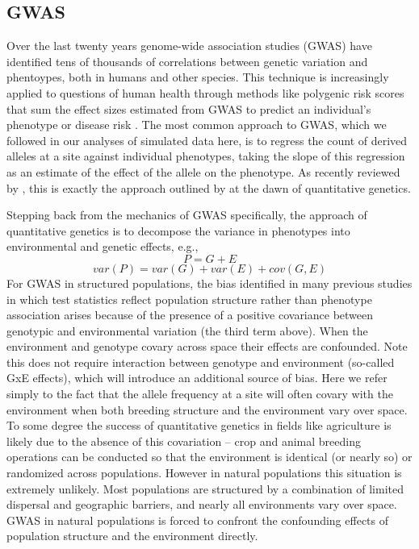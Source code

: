 \documentclass[11pt,twoside,lineno]{preprint}
\begin{document}
\subsection{GWAS}
Over the last twenty years genome-wide association studies (GWAS) have identified tens of thousands of correlations between genetic variation and phentoypes, both in humans and other species. This technique is increasingly applied to questions of human health through methods like polygenic risk scores that sum the effect sizes estimated from GWAS to predict an individual's phenotype or disease risk \citep{Khera2018}. The most common approach to GWAS, which we followed in our analyses of simulated data here, is to regress the count of derived alleles at a site against individual phenotypes, taking the slope of this regression as an estimate of the effect of the allele on the phenotype. As recently reviewed by \cite{Visscher2019}, this is exactly the approach outlined by \cite{Fisher1918} at the dawn of quantitative genetics. 

Stepping back from the mechanics of GWAS specifically, the approach of quantitative genetics is to decompose the variance in phenotypes into environmental and genetic effects, e.g., 
\begin{equation}
P=G+E
\end{equation}
\begin{equation}
var(P)=var(G)+var(E)+cov(G,E)
\end{equation}
For GWAS in structured populations, the bias identified in many previous studies \citep{Price2006,Yu2006,Young2018,Mathieson2012,Kang2008,Kang2010,Bulik-Sullivan2015} in which test statistics reflect population structure rather than phenotype association arises because of the presence of a positive covariance between genotypic and environmental variation (the third term above). When the environment and genotype covary across space their effects are confounded. Note this does not require interaction between genotype and environment (so-called GxE effects), which will introduce an additional source of bias. Here we refer simply to the fact that the allele frequency at a site will often covary with the environment when both breeding structure and the environment vary over space. To some degree the success of quantitative genetics in fields like agriculture is likely due to the absence of this covariation -- crop and animal breeding operations can be conducted so that the environment is identical (or nearly so) or randomized across populations. However in natural populations this situation is extremely unlikely. Most populations are structured by a combination of limited dispersal and geographic barriers, and nearly all environments vary over space. GWAS in natural populations is forced to confront the confounding effects of population structure and the environment directly. 
\end{document}
